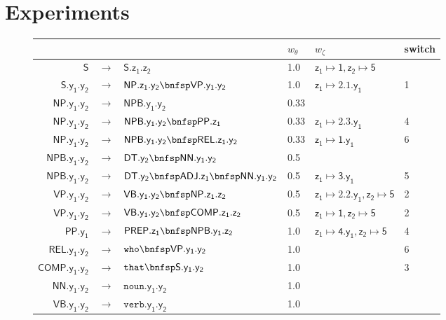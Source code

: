\documentclass[11pt,a4paper]{article}
\renewcommand{\bnfpn}[1]{\mathsf{#1}}
\renewcommand{\bnfpo}{\rightarrow}
\renewcommand{\bnfts}[1]{\mathtt{#1}}
\begin{document}
\section{Experiments}

\begin{figure}[p]
\centering
\begin{tabular}{rcl|l|l|l} 
&&&$w_\theta$&$w_\zeta$&switch\\
\hline \hline
$\bnfpn{S}$ &$\bnfpo$& $\bnfpn{S.z_1.z_2}$ & 1.0 & $\bnfpn{z_1} \mapsto \bnfpn{1}, \bnfpn{z_2} \mapsto \bnfpn{5}$ \\
$\bnfpn{S.y_1.y_2}$ &$\bnfpo$& $\bnfpn{NP.z_1.y_2} \bnfsp \bnfpn{VP.y_1.y_2}$ & 1.0 & $\bnfpn{z_1} \mapsto \bnfpn{2.1.y_1}$&1\\
$\bnfpn{NP.y_1.y_2}$ &$\bnfpo$& $\bnfpn{NPB.y_1.y_2} $ & 0.33 & \\
$\bnfpn{NP.y_1.y_2}$ &$\bnfpo$& $\bnfpn{NPB.y_1.y_2} \bnfsp \bnfpn{PP.z_1}$ & 0.33 & $\bnfpn{z_1} \mapsto \bnfpn{2.3.y_1}$ & 4\\
$\bnfpn{NP.y_1.y_2}$ &$\bnfpo$& $\bnfpn{NPB.y_1.y_2} \bnfsp \bnfpn{REL.z_1.y_2}$ & 0.33 & $\bnfpn{z_1} \mapsto \bnfpn{1.y_1}$ & 6\\
$\bnfpn{NPB.y_1.y_2}$ &$\bnfpo$& $\bnfpn{DT.y_2} \bnfsp \bnfpn{NN.y_1.y_2}$ & 0.5 & \\
$\bnfpn{NPB.y_1.y_2}$ &$\bnfpo$& $\bnfpn{DT.y_2} \bnfsp \bnfpn{ADJ.z_1} \bnfsp \bnfpn{NN.y_1.y_2}$ & 0.5 & $\bnfpn{z_1} \mapsto \bnfpn{3.y_1}$ & 5\\
$\bnfpn{VP.y_1.y_2}$ &$\bnfpo$& $\bnfpn{VB.y_1.y_2} \bnfsp \bnfpn{NP.z_1.z_2}$ & 0.5 & $\bnfpn{z_1} \mapsto \bnfpn{2.2.y_1}, \bnfpn{z_2} \mapsto \bnfpn{5}$ & 2\\
$\bnfpn{VP.y_1.y_2}$ &$\bnfpo$& $\bnfpn{VB.y_1.y_2} \bnfsp \bnfpn{COMP.z_1.z_2}$ & 0.5 & $\bnfpn{z_1} \mapsto \bnfpn{1}, \bnfpn{z_2} \mapsto \bnfpn{5}$ & 2\\
$\bnfpn{PP.y_1}$ &$\bnfpo$& $\bnfpn{PREP.z_1} \bnfsp \bnfpn{NPB.y_1.z_2}$ & 1.0 & $\bnfpn{z_1} \mapsto \bnfpn{4.y_1}, \bnfpn{z_2} \mapsto \bnfpn{5}$ & 4\\
$\bnfpn{REL.y_1.y_2}$ &$\bnfpo$& $\bnfts{who} \bnfsp \bnfpn{VP.y_1.y_2}$ & 1.0 & & 6 \\
$\bnfpn{COMP.y_1.y_2}$ &$\bnfpo$& $\bnfts{that} \bnfsp \bnfpn{S.y_1.y_2}$ & 1.0 & & 3\\
$\bnfpn{NN.y_1.y_2}$ &$\bnfpo$& $\bnfts{noun}.\bnfpn{y_1.y_2}$ & 1.0 & \\
$\bnfpn{VB.y_1.y_2}$ &$\bnfpo$& $\bnfts{verb}.\bnfpn{y_1.y_2}$ & 1.0 & \\

\end{tabular}
\end{figure}
\end{document}
